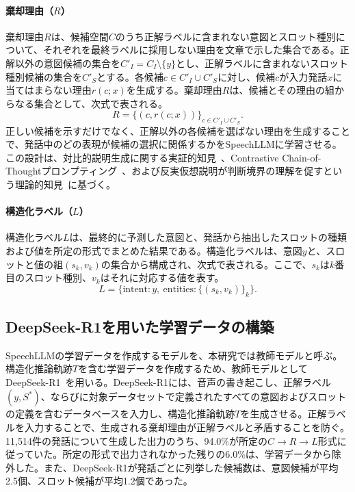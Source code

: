 \documentclass[11pt,a4paper]{ltjsarticle}
\begin{document}
\paragraph{棄却理由（$R$）}
棄却理由$R$は、候補空間$C$のうち正解ラベルに含まれない意図とスロット種別について、それぞれを最終ラベルに採用しない理由を文章で示した集合である。正解以外の意図候補の集合を$C'_I=C_I\setminus\{y\}$とし、正解ラベルに含まれないスロット種別候補の集合を$C'_S$とする。各候補$c\in C'_I\cup C'_S$に対し、候補$c$が入力発話$x$に当てはまらない理由$r(c;x)$を生成する。棄却理由$R$は、候補とその理由の組からなる集合として、次式で表される。
\begin{equation}
R=\{(c,r(c;x))\}_{c\in C'_I\cup C'_S}.
\tag{3}
\end{equation}
正しい候補を示すだけでなく、正解以外の各候補を選ばない理由を生成することで、発話中のどの表現が候補の選択に関係するかをSpeechLLMに学習させる。この設計は、対比的説明生成に関する実証的知見~\cite{chen-etal-2021-kace}、Contrastive Chain-of-Thoughtプロンプティング~\cite{shim2024chainofthoughtaugmentationlogitcontrast}、および反実仮想説明が判断境界の理解を促すという理論的知見~\cite{verma2021counterfactual}に基づく。

\paragraph{構造化ラベル（$L$）}
構造化ラベル$L$は、最終的に予測した意図と、発話から抽出したスロットの種類および値を所定の形式でまとめた結果である。構造化ラベルは、意図$y$と、スロットと値の組$(s_k,v_k)$の集合から構成され、次式で表される。ここで、$s_k$は$k$番目のスロット種別、$v_k$はそれに対応する値を表す。
\begin{equation}
L=\{\mathrm{intent}:y,\ \mathrm{entities}:\{(s_k,v_k)\}_k\}.
\tag{4}
\end{equation}

\subsection{DeepSeek-R1を用いた学習データの構築}
SpeechLLMの学習データを作成するモデルを、本研究では教師モデルと呼ぶ。構造化推論軌跡$T$を含む学習データを作成するため、教師モデルとしてDeepSeek-R1~\cite{Guo_2025}を用いる。DeepSeek-R1には、音声の書き起こし、正解ラベル$(y,S^*)$、ならびに対象データセットで定義されたすべての意図およびスロットの定義を含むデータベースを入力し、構造化推論軌跡$T$を生成させる。正解ラベルを入力することで、生成される棄却理由が正解ラベルと矛盾することを防ぐ。11,514件の発話について生成した出力のうち、94.0\%が所定の$C\rightarrow R\rightarrow L$形式に従っていた。所定の形式で出力されなかった残りの6.0\%は、学習データから除外した。また、DeepSeek-R1が発話ごとに列挙した候補数は、意図候補が平均2.5個、スロット候補が平均1.2個であった。
\end{document}
